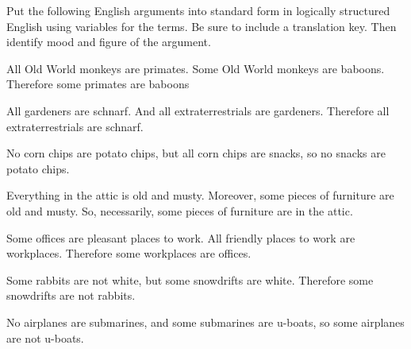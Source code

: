  \noindent\problempart Put the following English arguments into standard form in logically structured English using variables for the terms. Be sure to include a translation key. Then identify mood and figure of the argument.


\begin{exercises}
\item All Old World monkeys are primates. Some Old World monkeys are baboons. Therefore some primates are baboons

 
\item All gardeners are schnarf. And all extraterrestrials are gardeners. Therefore all extraterrestrials are schnarf. 

 
\item No corn chips are potato chips, but all corn chips are snacks, so no snacks are potato chips. 

 
\item Everything in the attic is old and musty. Moreover, some pieces of furniture are old and musty. So, necessarily, some pieces of furniture are in the attic.


 
\item Some offices are pleasant places to work. All friendly places to work are workplaces. Therefore some workplaces are offices. 
 
 

\item Some rabbits are not white, but some snowdrifts are white. Therefore some snowdrifts are not rabbits.  

 
\item No airplanes are submarines, and some submarines are u-boats, so some airplanes are not u-boats.


\end{exercises}
